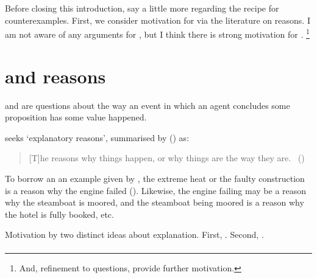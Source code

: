 \begin{note}
  Before closing this introduction, say a little more regarding the recipe for counterexamples.
  First, we consider motivation for \issueInclusion{} via the literature on reasons.
  I am not aware of any arguments for \issueInclusion{}, but I think there is strong motivation for \issueInclusion{}.%
  \footnote{
    \color{red}
    And, refinement to questions, provide further motivation.
  }
\end{note}

\section*{\issueInclusion{} and reasons}
\label{sec:reasons}

\begin{note}
  \qWhy{} and \qHow{} are questions about the way an event in which an agent concludes some proposition has some value happened.

  \qWhy{} seeks `explanatory reasons', summarised by \citeauthor{Hieronymi:2011aa} (\citeyear{Hieronymi:2011aa}) as:

  \begin{quote}
    [T]he reasons why things happen, or why things are the way they are.\newline
    \mbox{ }\hfill\mbox{(\citeyear[410]{Hieronymi:2011aa})}
  \end{quote}

  To borrow an an example given by \citeauthor{Hieronymi:2011aa}, the extreme heat or the faulty construction is a reason why the engine failed (\citeyear[409]{Hieronymi:2011aa}).
  Likewise, the engine failing may be a reason why the steamboat is moored, and the steamboat being moored is a reason why the hotel is fully booked, etc.
\end{note}

\begin{note}
  Motivation by two distinct ideas about explanation.
  First, .
  Second, .
\end{note}

\paragraph*{}

